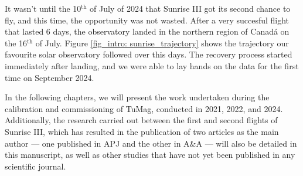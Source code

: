 It wasn't until the 10$^{\text{th}}$ of July of 2024 that Sunrise III got its second chance to fly, and this time, the opportunity was not wasted. After a very succesful flight that lasted 6 days, the observatory landed in the northern region of Canadá on the 16$^{\text{th}}$ of July. Figure \ref{fig_intro: sunrise_trajectory} shows the trajectory our favourite solar observatory followed over this days. The recovery process started immediately after landing, and we were able to lay hands on the data for the first time on September 2024. 

In the following chapters, we will present the work undertaken during the calibration and commissioning of TuMag, conducted in 2021, 2022, and 2024. Additionally, the research carried out between the first and second flights of Sunrise III, which has resulted in the publication of two articles as the main author — one published in APJ and the other in A\&A — will also be detailed in this manuscript, as well as other studies that have not yet been published in any scientific journal. 






